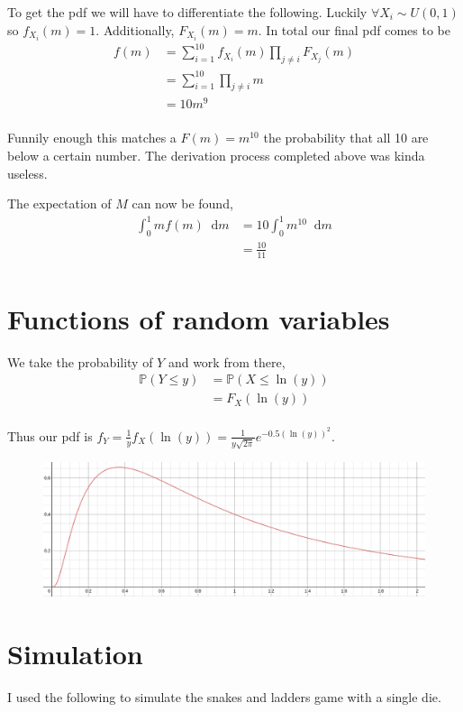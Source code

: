 \documentclass{article}
\newcommand{\diff}{\mathop{}\!\mathrm{d}}
\newcommand{\prob}{\mathbb{P}}
\begin{document}
To get the pdf we will have to differentiate the following. Luckily
$\forall X_i \sim U(0,1)$ so $f_{X_i}(m) = 1$. Additionally, $F_{X_i}(m) = m$.
In total our final pdf comes
to be
\begin{align*}
    f(m) &= \sum_{i=1}^{10} f_{X_i}(m) \prod_{j \neq i} F_{X_j}(m) \\
    &= \sum_{i=1}^{10} \prod_{j \neq i} m \\
    &= 10m^9 \\
\end{align*}

Funnily enough this matches a $F(m) = m^{10}$ the probability that all 10
are below a certain number. The derivation process completed above was
kinda useless.

The expectation of $M$ can now be found,
\begin{align*}
    \int_0^1 m f(m) \diff m &= 10 \int_0^1 m^10 \diff m \\
    &= \frac{10}{11} \\
\end{align*}

\section{Functions of random variables}
We take the probability of $Y$ and work from there,
\begin{align*}
    \prob(Y \leq y) &= \prob(X \leq \ln(y)) \\
    &= F_X(\ln(y)) \\
\end{align*}

Thus our pdf is $f_Y = \frac{1}{y} f_X(\ln(y)) = \frac{1}{y\sqrt{2\pi}}e^{-0.5(\ln(y))^2}$.
\begin{figure}[H]
    \centering
    \includegraphics[width=5in]{graph.png}
\end{figure}

\section{Simulation}
I used the following to simulate the snakes and ladders game with a single die.

\end{document}
